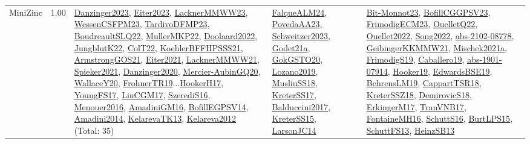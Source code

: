 {\begin{longtable}{p{3cm}r>{\raggedright\arraybackslash}p{6cm}>{\raggedright\arraybackslash}p{6cm}>{\raggedright\arraybackslash}p{8cm}}
\index{MiniZinc}\index{CPSystems!MiniZinc}MiniZinc &  1.00 & \hyperref[detail:Danzinger2023]{Danzinger2023}, \hyperref[detail:Eiter2023]{Eiter2023}, \hyperref[detail:LacknerMMWW23]{LacknerMMWW23}, \hyperref[detail:WessenCSFPM23]{WessenCSFPM23}, \hyperref[detail:TardivoDFMP23]{TardivoDFMP23}, \hyperref[detail:BoudreaultSLQ22]{BoudreaultSLQ22}, \hyperref[detail:MullerMKP22]{MullerMKP22}, \hyperref[detail:Doolaard2022]{Doolaard2022}, \hyperref[detail:JungblutK22]{JungblutK22}, \hyperref[detail:ColT22]{ColT22}, \hyperref[detail:KoehlerBFFHPSSS21]{KoehlerBFFHPSSS21}, \hyperref[detail:ArmstrongGOS21]{ArmstrongGOS21}, \hyperref[detail:Eiter2021]{Eiter2021}, \hyperref[detail:LacknerMMWW21]{LacknerMMWW21}, \hyperref[detail:Spieker2021]{Spieker2021}, \hyperref[detail:Danzinger2020]{Danzinger2020}, \hyperref[detail:Mercier-AubinGQ20]{Mercier-AubinGQ20}, \hyperref[detail:WallaceY20]{WallaceY20}, \hyperref[detail:FrohnerTR19]{FrohnerTR19}...\hyperref[detail:HookerH17]{HookerH17}, \hyperref[detail:YoungFS17]{YoungFS17}, \hyperref[detail:LiuCGM17]{LiuCGM17}, \hyperref[detail:SzerediS16]{SzerediS16}, \hyperref[detail:Menouer2016]{Menouer2016}, \hyperref[detail:AmadiniGM16]{AmadiniGM16}, \hyperref[detail:BofillEGPSV14]{BofillEGPSV14}, \hyperref[detail:Amadini2014]{Amadini2014}, \hyperref[detail:KelarevaTK13]{KelarevaTK13}, \hyperref[detail:Kelareva2012]{Kelareva2012} (Total: 35) & \hyperref[detail:FalqueALM24]{FalqueALM24}, \hyperref[detail:PovedaAA23]{PovedaAA23}, \hyperref[detail:Schweitzer2023]{Schweitzer2023}, \hyperref[detail:Godet21a]{Godet21a}, \hyperref[detail:GokGSTO20]{GokGSTO20}, \hyperref[detail:Lozano2019]{Lozano2019}, \hyperref[detail:MusliuSS18]{MusliuSS18}, \hyperref[detail:KreterSS17]{KreterSS17}, \hyperref[detail:Balduccini2017]{Balduccini2017}, \hyperref[detail:KreterSS15]{KreterSS15}, \hyperref[detail:LarsonJC14]{LarsonJC14} & \hyperref[detail:Bit-Monnot23]{Bit-Monnot23}, \hyperref[detail:BofillCGGPSV23]{BofillCGGPSV23}, \hyperref[detail:FrimodigECM23]{FrimodigECM23}, \hyperref[detail:OuelletQ22]{OuelletQ22}, \hyperref[detail:Ouellet2022]{Ouellet2022}, \hyperref[detail:Song2022]{Song2022}, \hyperref[detail:abs-2102-08778]{abs-2102-08778}, \hyperref[detail:GeibingerKKMMW21]{GeibingerKKMMW21}, \hyperref[detail:Mischek2021a]{Mischek2021a}, \hyperref[detail:FrimodigS19]{FrimodigS19}, \hyperref[detail:Caballero19]{Caballero19}, \hyperref[detail:abs-1901-07914]{abs-1901-07914}, \hyperref[detail:Hooker19]{Hooker19}, \hyperref[detail:EdwardsBSE19]{EdwardsBSE19}, \hyperref[detail:BehrensLM19]{BehrensLM19}, \hyperref[detail:CappartTSR18]{CappartTSR18}, \hyperref[detail:KreterSSZ18]{KreterSSZ18}, \hyperref[detail:DemirovicS18]{DemirovicS18}, \hyperref[detail:ErkingerM17]{ErkingerM17}, \hyperref[detail:TranVNB17]{TranVNB17}, \hyperref[detail:FontaineMH16]{FontaineMH16}, \hyperref[detail:SchuttS16]{SchuttS16}, \hyperref[detail:BurtLPS15]{BurtLPS15}, \hyperref[detail:SchuttFS13]{SchuttFS13}, \hyperref[detail:HeinzSB13]{HeinzSB13}\\

\end{longtable}}
